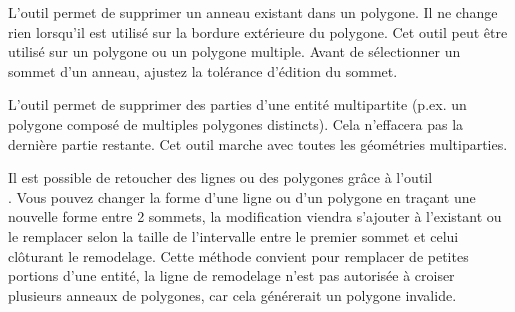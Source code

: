 L'outil  permet de supprimer un anneau existant dans un polygone. Il ne change rien lorsqu’il est utilisé sur la bordure extérieure du polygone. Cet outil peut être utilisé sur un polygone ou un polygone multiple. Avant de sélectionner un sommet d'un anneau, ajustez la tolérance d'édition du sommet.


L'outil  permet de supprimer des parties d'une entité multipartite (p.ex. un polygone composé de multiples polygones distincts). Cela n'effacera pas la dernière partie restante. Cet outil marche avec toutes les géométries multiparties.


Il est possible de retoucher des lignes ou des polygones grâce à l'outil\\ 
. Vous pouvez changer la forme 
d'une ligne ou d'un polygone en traçant une nouvelle forme entre 2 sommets, la 
modification viendra s'ajouter à l'existant ou le remplacer selon la taille de 
l'intervalle entre le premier sommet et celui clôturant le remodelage. Cette 
méthode convient pour remplacer de petites portions d'une entité, la ligne de 
remodelage n'est pas autorisée à croiser plusieurs anneaux de polygones, car 
cela générerait un polygone invalide.

